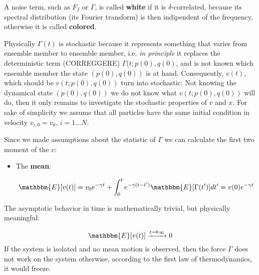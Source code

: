 \documentclass{article}
\begin{document}
A noise term, such as $F_{f}$ or $\Gamma$, is called \textbf{white} if it is $\delta$-correlated, because its spectral distribution (its Fourier transform) is then indipendent of the frequency, otherwise it is called \textbf{colored}.\newline

Physically $\Gamma(t)$ is stochastic because it represents something that varies from ensemble member to ensemble member, i.e. \textit{in principle} it replaces the deterministic term (CORREGGERE) $\Gamma(t;p(0),q(0)$, and is not known which ensemble member the state $(p(0),q(0))$ is at hand. Consequently, $v(t)$, which should be $v(t;p(0),q(0))$ turn into stochastic: Not knowing the dynamical state $(p(0),q(0))$ we do not know what $v(t;p(0),q(0))$ will do, then it only remains to investigate the stochastic properties of $v$ and $x$. For sake of simplicity we assume that all particles have the same initial condition in velocity $v_{i,0} = v_0$, $i=1...N$.

Since we made assumptions about the statistic of $\Gamma$ we can calculate the first two moment of the $v$: 
\begin{itemize}

\item The \textbf{mean}:

	$$ \mathbbm{E}[v(t)] = v_0 e^{-\gamma t} + \int_{0}^{t} e^{- \gamma (t-t')} \mathbbm{E}[\Gamma(t')] dt' = v(0) e^{-\gamma t} $$

\end{itemize}

The asymptotic behavior in time is mathematically trivial, but physically meaningful:

\begin{equation}
 \mathbbm{E}[v(t)] \xrightarrow{t \xrightarrow{} \infty} 0
\end{equation}
If the system is isolated and no mean motion is observed, then the force $\Gamma$ does not work on the system otherwise, according to the first law of thermodynamics, it would freeze.
\end{document}
